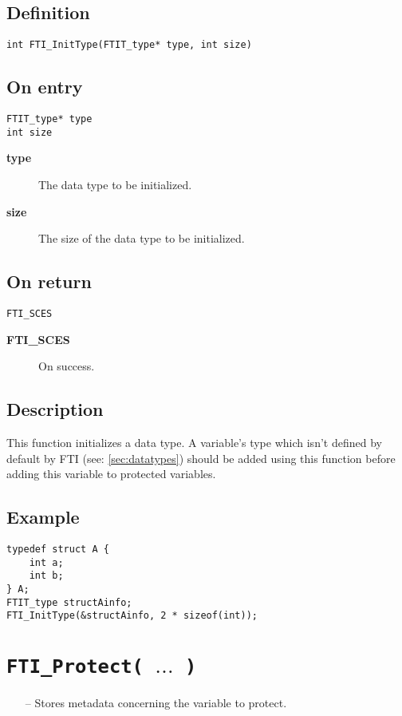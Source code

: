 \documentclass{refrep}
\begin{document}
\subsection*{Definition}
\begin{lstlisting}[frame=single]
int FTI_InitType(FTIT_type* type, int size)
\end{lstlisting}
\subsection*{On entry}
\begin{lstlisting}[frame=single]
FTIT_type* type
int size
\end{lstlisting}
\begin{description}
\item[\textbf{type}] The data type to be initialized.
\item[\textbf{size}] The size of the data type to be initialized.
\end{description}
\subsection*{On return}
\begin{lstlisting}[frame=single]
FTI_SCES
\end{lstlisting}
\begin{description}
\item[\textbf{FTI\_SCES}] On success.
\end{description}
\subsection*{Description}
This function initializes a data type. A variable's type which isn't defined by default by FTI (see: \ref{sec:datatypes}) should be added using this function before adding this variable to protected variables.
\subsection*{Example}
\begin{center}
\begin{lstlisting}[frame=single]
typedef struct A {
    int a;
    int b;
} A;
FTIT_type structAinfo;
FTI_InitType(&structAinfo, 2 * sizeof(int));
\end{lstlisting}
\end{center}
\newpage
\section{\tt FTI\_Protect( $\dots$ )}\label{sec:ftiprotect}
\begin{framed}
\begin{itemize}
\item[--] Stores metadata concerning the variable to protect.
\end{itemize}
\end{framed}
\end{document}

